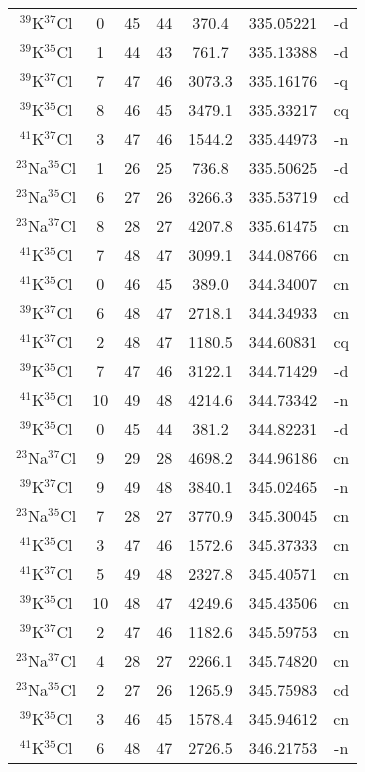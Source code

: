 \begin{table*}[htp]
\begin{tabular}{ccccccc}
$^{39}$K$^{37}$Cl & 0 & 45 & 44 & 370.4 & 335.05221 & -d \\
$^{39}$K$^{35}$Cl & 1 & 44 & 43 & 761.7 & 335.13388 & -d \\
$^{39}$K$^{37}$Cl & 7 & 47 & 46 & 3073.3 & 335.16176 & -q \\
$^{39}$K$^{35}$Cl & 8 & 46 & 45 & 3479.1 & 335.33217 & cq \\
$^{41}$K$^{37}$Cl & 3 & 47 & 46 & 1544.2 & 335.44973 & -n \\
$^{23}$Na$^{35}$Cl & 1 & 26 & 25 & 736.8 & 335.50625 & -d \\
$^{23}$Na$^{35}$Cl & 6 & 27 & 26 & 3266.3 & 335.53719 & cd \\
$^{23}$Na$^{37}$Cl & 8 & 28 & 27 & 4207.8 & 335.61475 & cn \\
$^{41}$K$^{35}$Cl & 7 & 48 & 47 & 3099.1 & 344.08766 & cn \\
$^{41}$K$^{35}$Cl & 0 & 46 & 45 & 389.0 & 344.34007 & cn \\
$^{39}$K$^{37}$Cl & 6 & 48 & 47 & 2718.1 & 344.34933 & cn \\
$^{41}$K$^{37}$Cl & 2 & 48 & 47 & 1180.5 & 344.60831 & cq \\
$^{39}$K$^{35}$Cl & 7 & 47 & 46 & 3122.1 & 344.71429 & -d \\
$^{41}$K$^{35}$Cl & 10 & 49 & 48 & 4214.6 & 344.73342 & -n \\
$^{39}$K$^{35}$Cl & 0 & 45 & 44 & 381.2 & 344.82231 & -d \\
$^{23}$Na$^{37}$Cl & 9 & 29 & 28 & 4698.2 & 344.96186 & cn \\
$^{39}$K$^{37}$Cl & 9 & 49 & 48 & 3840.1 & 345.02465 & -n \\
$^{23}$Na$^{35}$Cl & 7 & 28 & 27 & 3770.9 & 345.30045 & cn \\
$^{41}$K$^{35}$Cl & 3 & 47 & 46 & 1572.6 & 345.37333 & cn \\
$^{41}$K$^{37}$Cl & 5 & 49 & 48 & 2327.8 & 345.40571 & cn \\
$^{39}$K$^{35}$Cl & 10 & 48 & 47 & 4249.6 & 345.43506 & cn \\
$^{39}$K$^{37}$Cl & 2 & 47 & 46 & 1182.6 & 345.59753 & cn \\
$^{23}$Na$^{37}$Cl & 4 & 28 & 27 & 2266.1 & 345.74820 & cn \\
$^{23}$Na$^{35}$Cl & 2 & 27 & 26 & 1265.9 & 345.75983 & cd \\
$^{39}$K$^{35}$Cl & 3 & 46 & 45 & 1578.4 & 345.94612 & cn \\
$^{41}$K$^{35}$Cl & 6 & 48 & 47 & 2726.5 & 346.21753 & -n \\

\end{tabular}
\end{table*}

